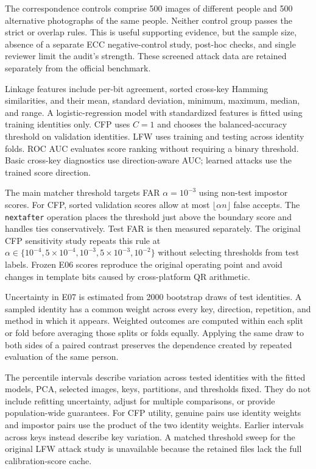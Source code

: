 The correspondence controls comprise 500 images of different people and 500 alternative photographs of the same people. Neither control group passes the strict or overlap rules. This is useful supporting evidence, but the sample size, absence of a separate ECC negative-control study, post-hoc checks, and single reviewer limit the audit's strength. These screened attack data are retained separately from the official benchmark.


Linkage features include per-bit agreement, sorted cross-key Hamming similarities, and their mean, standard deviation, minimum, maximum, median, and range. A logistic-regression model with standardized features is fitted using training identities only. CFP uses $C=1$ and chooses the balanced-accuracy threshold on validation identities. LFW uses training and testing across identity folds. ROC AUC evaluates score ranking without requiring a binary threshold. Basic cross-key diagnostics use direction-aware AUC; learned attacks use the trained score direction.

The main matcher threshold targets FAR $\alpha=10^{-3}$ using non-test impostor scores. For CFP, sorted validation scores allow at most $\lfloor\alpha n\rfloor$ false accepts. The \texttt{nextafter} operation places the threshold just above the boundary score and handles ties conservatively. Test FAR is then measured separately. The original CFP sensitivity study repeats this rule at $\alpha\in\{10^{-4},5\!\times\!10^{-4},10^{-3},5\!\times\!10^{-3},10^{-2}\}$ without selecting thresholds from test labels. Frozen E06 scores reproduce the original operating point and avoid changes in template bits caused by cross-platform QR arithmetic.


Uncertainty in E07 is estimated from 2000 bootstrap draws of test identities. A sampled identity has a common weight across every key, direction, repetition, and method in which it appears. Weighted outcomes are computed within each split or fold before averaging those splits or folds equally. Applying the same draw to both sides of a paired contrast preserves the dependence created by repeated evaluation of the same person.

The percentile intervals describe variation across tested identities with the fitted models, PCA, selected images, keys, partitions, and thresholds fixed. They do not include refitting uncertainty, adjust for multiple comparisons, or provide population-wide guarantees. For CFP utility, genuine pairs use identity weights and impostor pairs use the product of the two identity weights. Earlier intervals across keys instead describe key variation. A matched threshold sweep for the original LFW attack study is unavailable because the retained files lack the full calibration-score cache.

